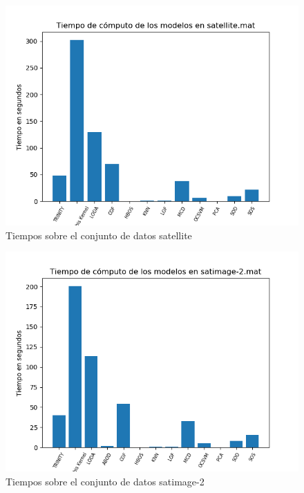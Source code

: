\begin{figure}[H]
	\centering
	\includegraphics[scale=0.7]{imagenes/imgs-exp1/times/satellite}
	\caption{Tiempos sobre el conjunto de datos satellite}
	\label{satellite_times}
\end{figure}

\begin{figure}[H]
	\centering
	\includegraphics[scale=0.7]{imagenes/imgs-exp1/times/satimage-2}
	\caption{Tiempos sobre el conjunto de datos satimage-2}
	\label{satimage-2_times}
\end{figure}

